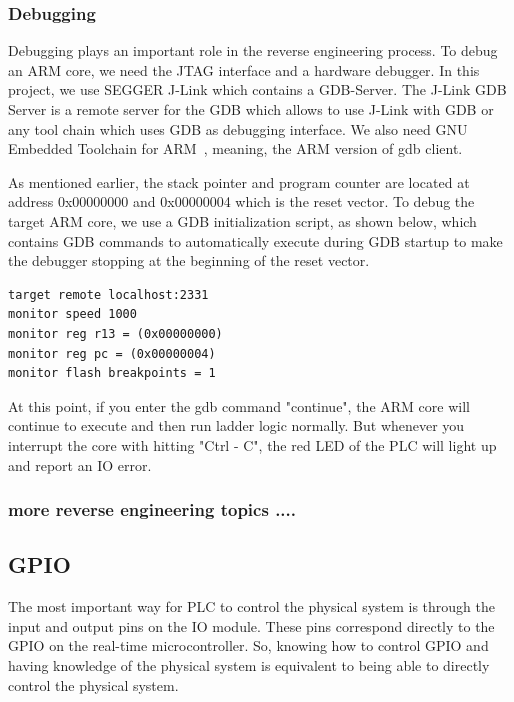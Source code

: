 \subsubsection{Debugging}

Debugging plays an important role in the reverse engineering process. To debug an ARM core, we need the JTAG interface and a hardware debugger. In this project, we use SEGGER J-Link which contains a GDB-Server. The J-Link GDB Server is a remote server for the GDB which allows to use J-Link with GDB or any tool chain which uses GDB as debugging interface. We also need GNU Embedded Toolchain for ARM~\cite{gnutoolchainarm}, meaning, the ARM version of gdb client.

As mentioned earlier, the stack pointer and program counter are located at address 0x00000000 and 0x00000004 which is the reset vector. To debug the target ARM core, we use a GDB initialization script, as shown below, which contains GDB commands to automatically execute during GDB startup to make the debugger stopping at the beginning of the reset vector.  

\begin{lstlisting}[basicstyle=\small, caption={GDB stript file .gdbinit}, captionpos=b]
target remote localhost:2331
monitor speed 1000
monitor reg r13 = (0x00000000)
monitor reg pc = (0x00000004)
monitor flash breakpoints = 1
\end{lstlisting}

At this point, if you enter the gdb command "continue", the ARM core will continue to execute and then run ladder logic normally. But whenever you interrupt the core with hitting "Ctrl - C", the red LED of the PLC will light up and report an IO error. 


\subsubsection{more reverse engineering topics ....}


\subsection{GPIO}
The most important way for PLC to control the physical system is through the input and output pins on the IO module. These pins correspond directly to the GPIO on the real-time microcontroller. So, knowing how to control GPIO and having knowledge of the physical system is equivalent to being able to directly control the physical system.

